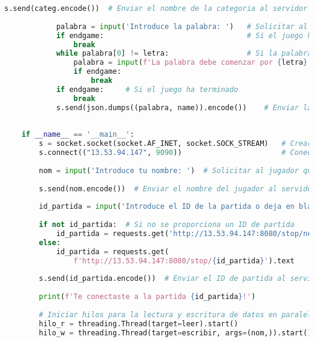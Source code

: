 \documentclass{article}
\begin{document}
\begin{lstlisting}[language=Python, caption={Código Python}, label={lst:python_code}]
            s.send(categ.encode())  # Enviar el nombre de la categoria al servidor
    
            palabra = input('Introduce la palabra: ')   # Solicitar al jugador que introduzca una palabra
            if endgame:                                 # Si el juego ha terminado
                break
            while palabra[0] != letra:                  # Si la palabra no comienza con la letra correcta
                palabra = input(f'La palabra debe comenzar por {letra}: ')  # Solicitar al jugador otra palabra
                if endgame:                                                 # Si el juego ha terminado
                    break
            if endgame:     # Si el juego ha terminado
                break
            s.send(json.dumps((palabra, name)).encode())    # Enviar la palabra y el nombre del jugador al servidor
    
    
    if __name__ == '__main__':
        s = socket.socket(socket.AF_INET, socket.SOCK_STREAM)   # Crear un objeto de socket TCP/IP
        s.connect(("13.53.94.147", 9090))                       # Conectar el socket al servidor y puerto especificados
    
        nom = input('Introduce tu nombre: ')  # Solicitar al jugador que introduzca su nombre
    
        s.send(nom.encode())  # Enviar el nombre del jugador al servidor
    
        id_partida = input('Introduce el ID de la partida o deja en blanco para crear una nueva: ')  # Solicitar al jugador que introduzca el ID de la partida
    
        if not id_partida:  # Si no se proporciona un ID de partida
            id_partida = requests.get('http://13.53.94.147:8080/stop/new').text  # Obtener nuevo ID de partida del servidor
        else:
            id_partida = requests.get(
                f'http://13.53.94.147:8080/stop/{id_partida}').text     # Obtener ID de partida del servidor con el ID dado
    
        s.send(id_partida.encode())  # Enviar el ID de partida al servidor
    
        print(f'Te conectaste a la partida {id_partida}!')
    
        # Iniciar hilos para la lectura y escritura de datos en paralelo
        hilo_r = threading.Thread(target=leer).start()  
        hilo_w = threading.Thread(target=escribir, args=(nom,)).start()
    
\end{lstlisting}
\end{document}
